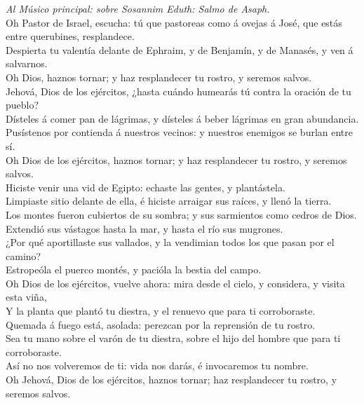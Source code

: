  \emph{Al Músico principal: sobre Sosannim Eduth: Salmo de
Asaph.}\\
Oh Pastor de Israel, escucha: tú que pastoreas como á ovejas á José, que
estás entre querubines, resplandece.\\
 Despierta tu valentía delante de Ephraim, y de Benjamín, y
de Manasés, y ven á salvarnos.\\
 Oh Dios, haznos tornar; y haz resplandecer tu rostro, y
seremos salvos.\\
 Jehová, Dios de los ejércitos, ¿hasta cuándo humearás tú
contra la oración de tu pueblo?\\
 Dísteles á comer pan de lágrimas, y dísteles á beber
lágrimas en gran abundancia.\\
 Pusístenos por contienda á nuestros vecinos: y nuestros
enemigos se burlan entre sí.\\
 Oh Dios de los ejércitos, haznos tornar; y haz resplandecer
tu rostro, y seremos salvos.\\
 Hiciste venir una vid de Egipto: echaste las gentes, y
plantástela.\\
 Limpiaste sitio delante de ella, é hiciste arraigar sus
raíces, y llenó la tierra.\\
 Los montes fueron cubiertos de su sombra; y sus sarmientos
como cedros de Dios.\\
 Extendió sus vástagos hasta la mar, y hasta el río sus
mugrones.\\
 ¿Por qué aportillaste sus vallados, y la vendimian todos
los que pasan por el camino?\\
 Estropeóla el puerco montés, y pacióla la bestia del
campo.\\
 Oh Dios de los ejércitos, vuelve ahora: mira desde el
cielo, y considera, y visita esta viña,\\
 Y la planta que plantó tu diestra, y el renuevo que para
ti corroboraste.\\
 Quemada á fuego está, asolada: perezcan por la reprensión
de tu rostro.\\
 Sea tu mano sobre el varón de tu diestra, sobre el hijo
del hombre que para ti corroboraste.\\
 Así no nos volveremos de ti: vida nos darás, é invocaremos
tu nombre.\\
 Oh Jehová, Dios de los ejércitos, haznos tornar; haz
resplandecer tu rostro, y seremos salvos.

